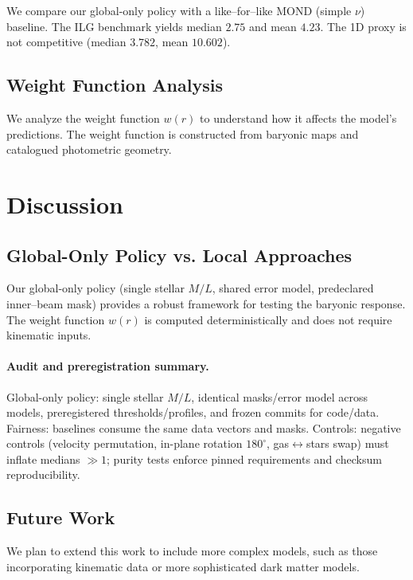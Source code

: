 \documentclass[usenatbib]{mnras}
\begin{document}
We compare our global-only policy with a like–for–like MOND (simple $\nu$) baseline. The ILG benchmark yields median $\mathbf{2.75}$ and mean $\mathbf{4.23}$. The 1D proxy is not competitive (median $\mathbf{3.782}$, mean $\mathbf{10.602}$).

\subsection{Weight Function Analysis}

We analyze the weight function $w(r)$ to understand how it affects the model's predictions. The weight function is constructed from baryonic maps and catalogued photometric geometry.

\section{Discussion}

\subsection{Global-Only Policy vs. Local Approaches}

Our global-only policy (single stellar $M/L$, shared error model, predeclared inner–beam mask) provides a robust framework for testing the baryonic response. The weight function $w(r)$ is computed deterministically and does not require kinematic inputs.

\paragraph*{Audit and preregistration summary.}
Global-only policy: single stellar $M/L$, identical masks/error model across models, preregistered thresholds/profiles, and frozen commits for code/data. Fairness: baselines consume the same data vectors and masks. Controls: negative controls (velocity permutation, in-plane rotation $180^\circ$, gas$\leftrightarrow$stars swap) must inflate medians $\gg 1$; purity tests enforce pinned requirements and checksum reproducibility.

\subsection{Future Work}

We plan to extend this work to include more complex models, such as those incorporating kinematic data or more sophisticated dark matter models.
\end{document}
